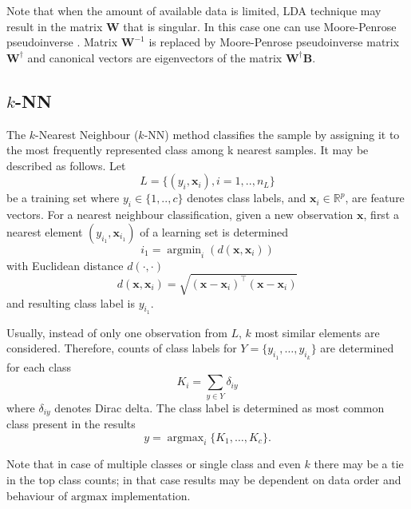 \documentclass[]{article}
\newcommand{\matb}[1]{\mathbf{#1}}
\newcommand{\R}{\mathbb{R}}
\begin{document}
Note that when the amount of available data is limited, LDA technique may result
in the matrix $\mathbf{W}$ that is singular.
In this case one can use Moore-Penrose pseudoinverse \cite{Tian:88}.
Matrix $\matb{W}^{-1}$ is replaced by Moore-Penrose pseudoinverse matrix
$\matb{W}^{\dagger}$ and canonical vectors are eigenvectors of the matrix
$\matb{W}^{\dagger}\matb{B}$.

\subsection{$k$-NN} \label{KNN}
The $k$-Nearest Neighbour ($k$-NN) method \cite{Hechenbichler:2004}
classifies the sample by assigning it to the  most frequently represented class
among k nearest samples. It may be described as follows. Let 
\begin{equation*}
L=\{(y_i,\mathbf{x}_i),i=1,..,n_L\}
\end{equation*}
be a training set where $y_i\in\{1,..,c\}$ denotes class labels, and
$\mathbf{x}_i\in\R^{p}$, are feature vectors. For a nearest neighbour 
classification, given a new observation $\mathbf{x}$, first a nearest element 
$(y_{i_1},\mathbf{x}_{i_1})$ of a learning set is determined 
\begin{equation*}
i_1 = \mathop{\mathrm{argmin}}_{i}(d(\mathbf{x},\mathbf{x}_i))
\end{equation*}
with Euclidean distance $d(\cdot,\cdot)$
\begin{equation*}
d(\mathbf{x},\mathbf{x}_i)=\sqrt{(\mathbf{x} - \mathbf{x}_i)^\top(\mathbf{x} - \mathbf{x}_i)}
\end{equation*}
and resulting class label is $y_{i_1}$.

Usually, instead of only one observation from $L$, $k$ most similar elements are
considered. Therefore, counts of class labels for 
$Y=\{y_{i_1}, \dots, y_{i_k}\}$ are determined for each class
\begin{equation*}
K_i=\sum_{y\in Y} \delta_{iy}
\end{equation*}
where $\delta_{iy}$ denotes Dirac delta.
The class label is determined as most common class present in the results
\begin{equation*}
y = \mathop{\mathrm{argmax}}_i \{K_1,\dots,K_c\}.
\end{equation*}

Note that in case of multiple classes or single class and even $k$ there may be
a tie in the top class counts; in that case results may be dependent on data
order and behaviour of $\mathrm{argmax}$ implementation.
\end{document}

